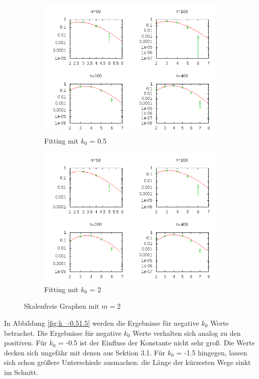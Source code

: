 \documentclass[10pt]{article}
\begin{document}
\begin{figure}[h!]
\begin{subfigure}{.5\textwidth}
  \centering
  \includegraphics[width=1\linewidth]{../Results/Power_constant_k05.png}
  \caption{Fitting mit $k_0$ = 0.5}
\end{subfigure}%
\begin{subfigure}{.5\textwidth}
  \centering
  \includegraphics[width=1\linewidth]{../Results/Power_constant_k2.png}
  \caption{Fitting mit $k_0$ = 2}
\end{subfigure}
\caption{Skalenfreie Graphen mit $m=2$}
\label{fig:k_0.52}
\end{figure}

In Abbildung \ref{fig:k_-0.51.5} werden die Ergebnisse für negative $k_0$ Werte betrachet. Die Ergebnisse für negative $k_0$ Werte verhalten sich analog zu den positiven. Für $k_0$ = -0.5 ist der Einfluss der Konstante nicht sehr groß. Die Werte decken sich ungefähr mit denen aus Sektion 3.1. Für $k_0$ = -1.5 hingegen, lassen sich schon größere Unterschiede ausmachen: die Länge der kürzesten Wege sinkt im Schnitt.
\end{document}
